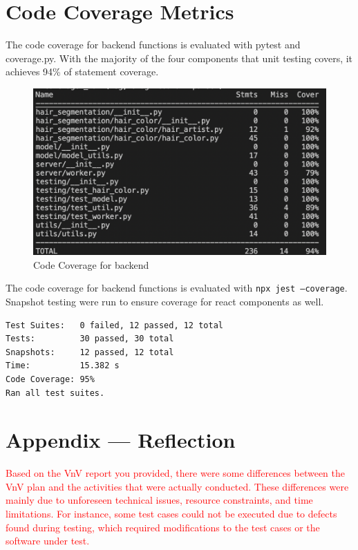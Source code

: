 \documentclass[12pt, titlepage]{article}
\begin{document}
\section{Code Coverage Metrics}

The code coverage for backend functions is evaluated with pytest and coverage.py. With the majority of the four components that unit testing covers, it achieves 94\% of statement coverage.

\begin{figure}[h]
  \centering
  \includegraphics[width=0.8\linewidth]{VnVReport/be_cover.png}
  \caption{Code Coverage for backend}
\end{figure}

\newline
\noindent The code coverage for backend functions is evaluated with \texttt{npx jest --coverage}. Snapshot testing were run to ensure coverage for react components as well. \\
\begin{verbatim}
Test Suites:   0 failed, 12 passed, 12 total
Tests:         30 passed, 30 total
Snapshots:     12 passed, 12 total
Time:          15.382 s
Code Coverage: 95%
Ran all test suites.
\end{verbatim}





\newpage{}
\section{Appendix --- Reflection}

\textcolor{red}{Based on the VnV report you provided, there were some differences between the VnV plan and the activities that were actually conducted. These differences were mainly due to unforeseen technical issues, resource constraints, and time limitations. For instance, some test cases could not be executed due to defects found during testing, which required modifications to the test cases or the software under test.}
\end{document}
